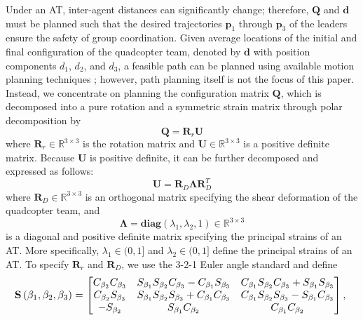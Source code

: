 \documentclass[journal]{IEEEtran}
\theoremstyle{definition}
\theoremstyle{plain}
\begin{document}
Under an AT, inter-agent distances can significantly change; therefore, $\mathbf{Q}$ and $\mathbf{d}$ must be planned such that the desired trajectories $\mathbf{p}_1$ through $\mathbf{p}_3$ of the leaders ensure the safety of group coordination. 
Given average locations of the initial and final configuration of the quadcopter team, denoted by $\mathbf{d}$ with position components $d_1$, $d_2$, and $d_3$, a feasible path can be planned using available motion planning techniques \cite{rastgoftar2022integration, rastgoftar2021safe}; however, path planning itself is not the focus of this paper. Instead, we concentrate on planning the configuration matrix $\mathbf{Q}$, which is decomposed into a pure rotation and a symmetric strain matrix through polar decomposition by
\begin{equation}
    \mathbf{Q}=\mathbf{R}_r\mathbf{U}
\end{equation}
where $\mathbf{R}_r\in \mathbb{R}^{3\times3}$ is the rotation matrix and $\mathbf{U}\in \mathbb{R}^{3\times 3}$ is a positive definite matrix. Because $\mathbf{U}$ is positive definite, it can be further decomposed and expressed as follows:
\begin{equation}
    \mathbf{U}=\mathbf{R}_D\mathbf{\Lambda}\mathbf{R}_D^T
\end{equation}
where $\mathbf{R}_D\in \mathbb{R}^{3\times 3}$ is an orthogonal matrix specifying the shear deformation of the quadcopter team, and 
\begin{equation}
    \mathbf{\Lambda}=\mathbf{diag}\left(\lambda_1,\lambda_2,1\right)\in \mathbb{R}^{3\times 3}
\end{equation}
is a diagonal and positive definite matrix specifying the principal strains of an AT.  More specifically, $\lambda_1\in (0,1]$ and $\lambda_2\in (0,1]$ define the principal strains of an AT.  
To specify $\mathbf{R}_r$ and $\mathbf{R}_D$, we use the 3-2-1 Euler angle standard and define
\begin{equation}\label{rotationmatrix}
\resizebox{0.99\hsize}{!}{%
$
    \mathbf{S}\left(\beta_1,\beta_2,\beta_3\right)=\begin{bmatrix}
    C_{\beta_2} C_{\beta_3}& S_{\beta_1}S_{\beta_2} C_{\beta_3}-C_{\beta_1}S_{\beta_3}  &C_{\beta_1}S_{\beta_2} C_{\beta_3}+S_{\beta_1}S_{\beta_3}\\
C_{\beta_2} S_{\beta_3}&S_{\beta_1}S_{\beta_2} S_{\beta_3}+C_{\beta_1}C_{\beta_3}&C_{\beta_1}S_{\beta_2} S_{\beta_3}-S_{\beta_1}C_{\beta_3}\\
   -S_{\beta_2} &S_{\beta_1}C_{\beta_2}&C_{\beta_1}C_{\beta_2}
\end{bmatrix}
,
$
}
\end{equation}
\end{document}
